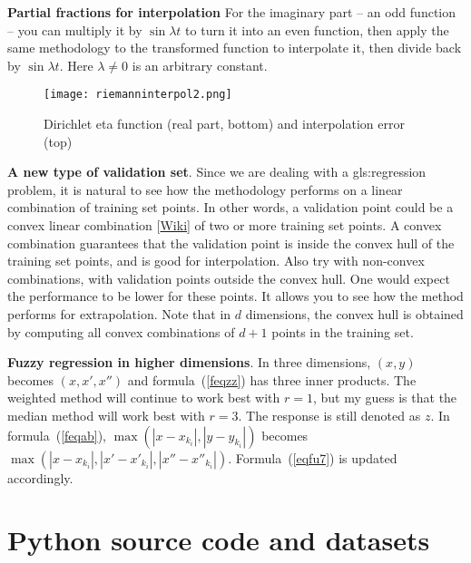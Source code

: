 \documentclass[oneside,10pt]{book}
\begin{document}
\begin{Exercise}{\bf Partial fractions for interpolation}
For the imaginary part -- an odd function -- you can multiply it by $\sin \lambda t$ to turn it into an even function, then apply the same methodology to the transformed function to interpolate it, then divide back by $\sin \lambda t$. Here $\lambda\neq 0$ is an arbitrary constant.
\end{Exercise}

\begin{figure}%
\centering
\texttt{[image: riemanninterpol2.png]}
\caption{Dirichlet eta function (real part, bottom) and interpolation error (top)}
\label{fig:friemann}
\end{figure}

\begin{Exercise}\label{fex3}{\bf A new type of validation set}. Since we are dealing with a \gls{gls:regression} problem, it is natural to see how the methodology performs on a linear combination
of training set points. In other words, a validation point could be a \textcolor{index}{convex linear combination} [\href{https://en.wikipedia.org/wiki/Convex_combination}{Wiki}] of two or more training set points. A convex combination guarantees that the validation point is inside the convex hull of the training set points, and is good for interpolation.  Also try with non-convex combinations, with validation points outside the convex hull. One would expect the performance to be lower for these points. It allows you to see how the method performs for \textcolor{index}{extrapolation}. Note that in $d$ dimensions, the convex hull is obtained by computing all convex combinations of $d+1$ points in the training set.
\end{Exercise}

\begin{Exercise}\label{fex4}{\bf Fuzzy regression in higher dimensions}. In three dimensions, $(x,y)$ becomes $(x,x',x'')$ and formula~(\ref{feqzz}) has three inner products. The weighted method will continue to work best with $r=1$, but my guess is that the median method will work best with $r=3$. The response is still denoted as $z$.
In formula~(\ref{feqab}), $\max(|x-x_{k_i}|,|y-y_{k_i}|)$ becomes $\max(|x-x_{k_i}|,|x'-x'_{k_i}|,|x''-x''_{k_i}|)$. Formula~(\ref{eqfu7}) is updated accordingly.
\end{Exercise}

\section{Python source code and datasets}\label{pythonfu}
\end{document}
